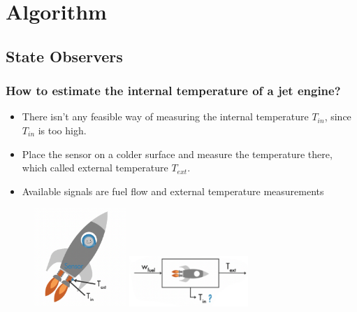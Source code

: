 \documentclass{beamer}
\begin{document}
\section{Algorithm}
\subsection{State Observers}

\begin{frame}
	\frametitle{How to estimate the internal temperature of a jet engine?}
	\begin{itemize}
		\item  There isn't any feasible way of measuring the internal temperature $T_{in} $, since $T_{in} $  is too high.
		\item Place the sensor on a colder surface and measure the temperature there, which called external temperature $T_{ext} $.
		\item Available signals are fuel flow and external temperature measurements
	\end{itemize}
	\begin{figure}
		\centering
		\includegraphics[width=3.5cm]{T_jet.png}
		\includegraphics[width=4.5cm]{T_observer.png}
	\end{figure}
\end{frame}
\end{document}
